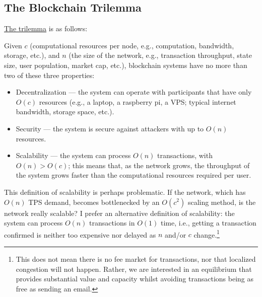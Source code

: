 \subsection{The Blockchain Trilemma}
\label{subsec:trilemma}

\href{\citeShardingFAQsLink}{The trilemma} is as follows:



Given $c$ (computational resources per node, e.g., computation, bandwidth, storage, etc.), and $n$ (the size of the network, e.g., transaction throughput, state size, user population, market cap, etc.), blockchain systems have no more than two of these three properties:

\begin{itemize}
  \item Decentralization --- the system can operate with participants that have only $O(c)$ resources (e.g., a laptop, a raspberry pi, a VPS; typical internet bandwidth, storage space, etc.).
  \item Security --- the system is secure against attackers with up to $O(n)$ resources.\footnotemark
  \item Scalability --- the system can process $O(n)$ transactions, with $O(n) > O(c)$; this means that, as the network grows, the throughput of the system grows faster than the computational resources required per user.
\end{itemize}


This definition of scalability is perhaps problematic.
If the network, which has $O(n)$ TPS demand, becomes bottlenecked by an $O(c^2)$ scaling method, is the network really scalable?
I prefer an alternative definition of scalability: the system can process $O(n)$ transactions in $O(1)$ time, i.e., getting a transaction confirmed is neither too expensive nor delayed as $n$ and/or $c$ change.\footnote{
    This does not mean there is no fee market for transactions, nor that localized congestion will not happen.
    Rather, we are interested in an equilibrium that provides substantial value and capacity whilst avoiding transactions being as free as sending an email.
}

